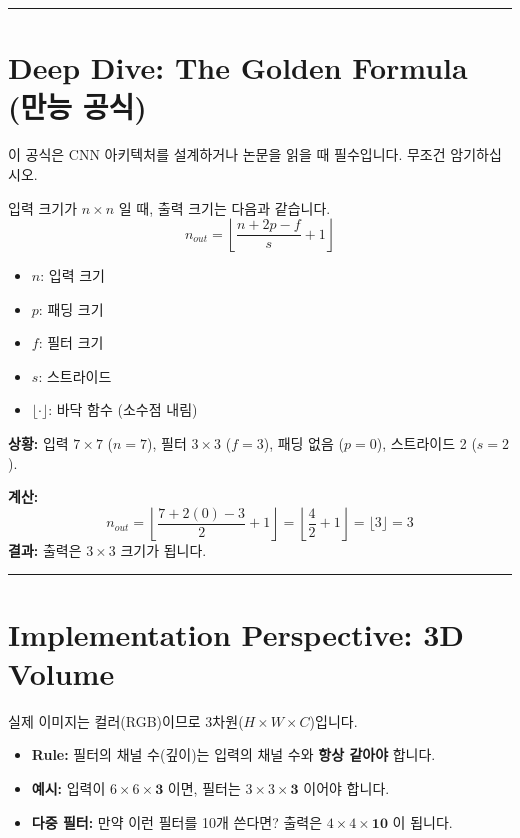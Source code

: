 \documentclass[11pt,a4paper]{book}
\theoremstyle{definition}
\begin{document}
\vspace{0.5cm}\hrule\vspace{0.5cm}

\section{Deep Dive: The Golden Formula (만능 공식)}

이 공식은 CNN 아키텍처를 설계하거나 논문을 읽을 때 필수입니다. 무조건 암기하십시오.

\begin{formulabox}[title={출력 크기 계산 공식}]
입력 크기가 $n \times n$ 일 때, 출력 크기는 다음과 같습니다.
$$ n_{out} = \left\lfloor \frac{n + 2p - f}{s} + 1 \right\rfloor $$
\begin{itemize}
    \item $n$: 입력 크기
    \item $p$: 패딩 크기
    \item $f$: 필터 크기
    \item $s$: 스트라이드
    \item $\lfloor \cdot \rfloor$: 바닥 함수 (소수점 내림)
\end{itemize}
\end{formulabox}

\begin{examplebox}[title={계산 예제}]
\textbf{상황:}
입력 $7 \times 7$ ($n=7$), 필터 $3 \times 3$ ($f=3$), 패딩 없음 ($p=0$), 스트라이드 2 ($s=2$).

\textbf{계산:}
$$ n_{out} = \left\lfloor \frac{7 + 2(0) - 3}{2} + 1 \right\rfloor = \left\lfloor \frac{4}{2} + 1 \right\rfloor = \lfloor 3 \rfloor = 3 $$
\textbf{결과:} 출력은 $3 \times 3$ 크기가 됩니다.
\end{examplebox}

\vspace{0.5cm}\hrule\vspace{0.5cm}

\section{Implementation Perspective: 3D Volume}

실제 이미지는 컬러(RGB)이므로 3차원($H \times W \times C$)입니다.
\begin{itemize}
    \item \textbf{Rule:} 필터의 채널 수(깊이)는 입력의 채널 수와 \textbf{항상 같아야} 합니다.
    \item \textbf{예시:} 입력이 $6 \times 6 \times \mathbf{3}$ 이면, 필터는 $3 \times 3 \times \mathbf{3}$ 이어야 합니다.
    \item \textbf{다중 필터:} 만약 이런 필터를 10개 쓴다면? 출력은 $4 \times 4 \times \mathbf{10}$ 이 됩니다.
\end{itemize}
\end{document}
